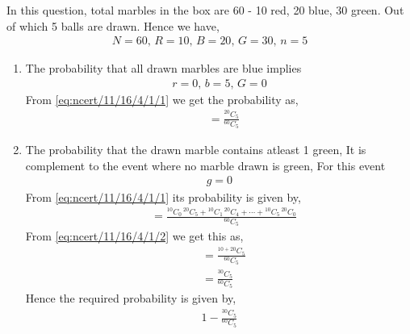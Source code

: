 \documentclass[journal,12pt,twocolumn]{IEEEtran}
\begin{document}
\begin{enumerate}
In this question, total marbles in the box are 60 - 10 red, 20 blue, 30 green. Out of which 5 balls are drawn. Hence we have,
\begin{align}
N = 60, \, R = 10, \,B = 20,  \, G = 30, \,n = 5
\end{align}
\begin{enumerate}
\item The probability that all drawn marbles are blue implies
\begin{align}
r = 0,\,  b = 5, \, G = 0
\end{align}
From \eqref{eq:ncert/11/16/4/1/1} we get the probability as,
\begin{align}
&= \frac{^{20}C_{5}}{^{60}C_{5}}
\end{align}
\item The probability that the drawn marble contains atleast 1 green, It is complement to the event where no marble drawn is green, For this event
\begin{align}
g = 0
\end{align}
From \eqref{eq:ncert/11/16/4/1/1} its probability is given by,
\begin{align}
&= \frac{{^{10}C_{0}} \, {^{20}C_{5}} + {^{10}C_{1}} \, {^{20}C_{4}} + \cdots + {^{10}C_{5}} \, {^{20}C_{0}}}{^{60}C_{5}}
\end{align}
From \eqref{eq:ncert/11/16/4/1/2} we get this as,
\begin{align}
&= \frac{^{10+20}C_{5}}{^{60}C_{5}}\\
&= \frac{^{30}C_{5}}{^{60}C_{5}}
\end{align}
Hence the required probability is given by,
\begin{align}
1 - \frac{^{30}C_{5}}{^{60}C_{5}}
\end{align}
\end{enumerate}
\end{enumerate}
\end{document}
